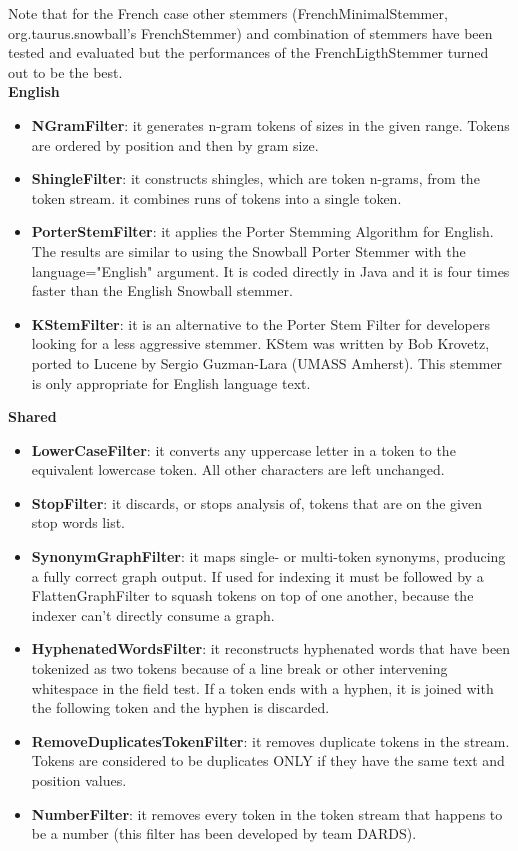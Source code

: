 Note that for the French case other stemmers (FrenchMinimalStemmer, org.taurus.snowball's FrenchStemmer) and combination of stemmers have been tested and evaluated but the performances of the FrenchLigthStemmer turned out to be the best.
\\
\textbf{English}
\begin{itemize}
    \item \textbf{NGramFilter}: it generates n-gram tokens of sizes in the given range. Tokens are ordered by position and then by gram size.
    \item \textbf{ShingleFilter}: it constructs shingles, which are token n-grams, from the token stream. it combines runs of tokens into a single token.
    \item \textbf{PorterStemFilter}: it applies the Porter Stemming Algorithm for English. The results are similar to using the Snowball Porter Stemmer with the language="English" argument. It is coded directly in Java and it is four times faster than the English Snowball stemmer.
    \item \textbf{KStemFilter}: it is an alternative to the Porter Stem Filter for developers looking for a less aggressive stemmer. KStem was written by Bob Krovetz, ported to Lucene by Sergio Guzman-Lara (UMASS Amherst). This stemmer is only appropriate for English language text.
\end{itemize}

\textbf{Shared}
\begin{itemize}
    \item \textbf{LowerCaseFilter}: it converts any uppercase letter in a token to the equivalent lowercase token. All other characters are left unchanged.
    \item \textbf{StopFilter}: it discards, or stops analysis of, tokens that are on the given stop words list.
    \item \textbf{SynonymGraphFilter}: it maps single- or multi-token synonyms, producing a fully correct graph output. If used for indexing it must be followed by a FlattenGraphFilter to squash tokens on top of one another, because the indexer can’t directly consume a graph.
    \item \textbf{HyphenatedWordsFilter}: it reconstructs hyphenated words that have been tokenized as two tokens because of a line break or other intervening whitespace in the field test. If a token ends with a hyphen, it is joined with the following token and the hyphen is discarded.
    \item \textbf{RemoveDuplicatesTokenFilter}: it removes duplicate tokens in the stream. Tokens are considered to be duplicates ONLY if they have the same text and position values.
    \item \textbf{NumberFilter}: it removes every token in the token stream that happens to be a number (this filter has been developed by team DARDS).
\end{itemize}

